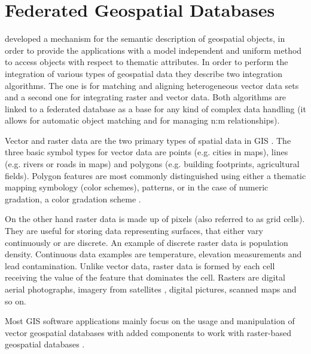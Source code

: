 \documentclass[12pt,a4paper]{report}
\newcommand{\acr}{\MakeUppercase}
\begin{document}
	\chapter{Federated Geospatial Databases}
	\label{sec:fed_geodata}

	\citet{Butenuth} developed a mechanism for the semantic description of 
	geospatial objects, in order to provide the applications with a model 
	independent and uniform method to access objects with respect to thematic 
	attributes. In order to perform the integration of various types of 
	geospatial data they describe two integration algorithms. The one is for 
	matching and aligning heterogeneous vector data sets and a second one for 
	integrating raster and vector data. Both algorithms are linked to a 
	federated database as a base for any kind of complex data handling (it 
	allows for automatic object matching and for managing n:m relationships).
	\par
	Vector and raster data are the two primary types of spatial data in 
	\acr{gis} \citep{vectorVSraster}. The three basic symbol types for vector 
	data are points (e.g. cities in maps), lines (e.g. rivers or roads in maps) 
	and polygons (e.g. building footprints, agricultural fields). Polygon 
	features are most commonly distinguished using either a thematic mapping 
	symbology (color schemes), patterns, or in the case of numeric gradation, 
	a color gradation scheme \citep{Dempsey}.
	\par 
	On the other hand raster data is made up of pixels (also referred to as 
	grid cells). They are useful for storing data representing surfaces, that 
	either vary continuously or are discrete. An example of discrete raster 
	data is population density. Continuous data examples are temperature,
	elevation measurements and lead contamination. Unlike vector data, raster 
	data is formed by each cell receiving the value of the feature that 
	dominates the cell. Rasters are digital aerial photographs, imagery from 
	satellites \citep{Butenuth}, digital pictures, scanned maps and so on.
	\par
	Most \acr{gis} software applications mainly focus on the usage and 
	manipulation of vector geospatial databases with added components to work 
	with raster-based geospatial databases \citep{Dempsey}.
	\\
\end{document}
